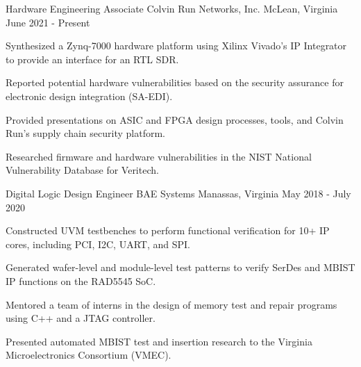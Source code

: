 \begin{cventries}


\cventry
{Hardware Engineering Associate} %
{Colvin Run Networks, Inc.} %
{McLean, Virginia} %
{June 2021 - Present} %
{
\begin{cvitems}
\item{Synthesized a Zynq-7000 hardware platform using Xilinx Vivado's IP Integrator to provide an interface for an RTL SDR.}
\item{Reported potential hardware vulnerabilities based on the security assurance for electronic design integration (SA-EDI).}
\item{Provided presentations on ASIC and FPGA design processes, tools, and Colvin Run's supply chain security platform.}
\item{Researched firmware and hardware vulnerabilities in the NIST National Vulnerability Database for Veritech.}
\end{cvitems}
}


\cventry
{Digital Logic Design Engineer} %
{BAE Systems} %
{Manassas, Virginia} %
{May 2018 - July 2020} %
{ %
\begin{cvitems}
\item {Constructed UVM testbenches to perform functional verification for 10+ IP cores, including PCI, I2C, UART, and SPI.}
\item {Generated wafer-level and module-level test patterns to verify SerDes and MBIST IP functions on the RAD5545 SoC.}
\item {Mentored a team of interns in the design of memory test and repair programs using C++ and a JTAG controller.}
\item{Presented automated MBIST test and insertion research to the Virginia Microelectronics Consortium (VMEC).} 
\end{cvitems}
}


\end{cventries}
